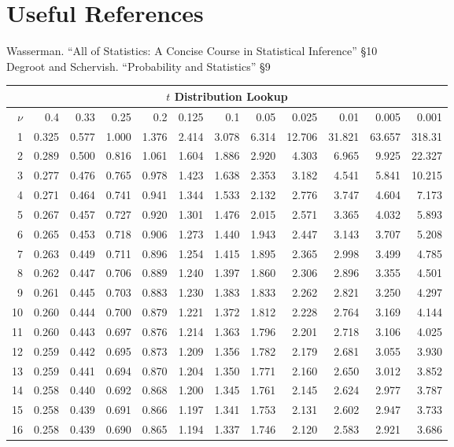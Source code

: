 \section*{Useful References}
Wasserman. ``All of Statistics: A Concise Course in Statistical Inference'' \S10\\
Degroot and Schervish. ``Probability and Statistics''  \S9
\clearpage 
\begin{center}
\begin{tabular}
      {|r||rrr|rrr|rrr|rr|}
\multicolumn{12}{c}{$t$ Distribution Lookup} \\
\hline
$\nu$&0.4&0.33&0.25&0.2&0.125&0.1&0.05&0.025&0.01&0.005
     &0.001\\
    \hline\hline
 1&0.325&0.577&1.000&1.376&2.414&3.078&6.314&12.706&31.821&63.657&318.31 \\
 2&0.289&0.500&0.816&1.061&1.604&1.886&2.920&4.303&6.965&9.925&22.327 \\
 3&0.277&0.476&0.765&0.978&1.423&1.638&2.353&3.182&4.541&5.841&10.215 \\
 4&0.271&0.464&0.741&0.941&1.344&1.533&2.132&2.776&3.747&4.604&7.173 \\
 5&0.267&0.457&0.727&0.920&1.301&1.476&2.015&2.571&3.365&4.032&5.893 \\
 \hline
 6&0.265&0.453&0.718&0.906&1.273&1.440&1.943&2.447&3.143&3.707&5.208 \\
 7&0.263&0.449&0.711&0.896&1.254&1.415&1.895&2.365&2.998&3.499&4.785 \\
 8&0.262&0.447&0.706&0.889&1.240&1.397&1.860&2.306&2.896&3.355&4.501 \\
 9&0.261&0.445&0.703&0.883&1.230&1.383&1.833&2.262&2.821&3.250&4.297 \\
10&0.260&0.444&0.700&0.879&1.221&1.372&1.812&2.228&2.764&3.169&4.144 \\
\hline
11&0.260&0.443&0.697&0.876&1.214&1.363&1.796&2.201&2.718&3.106&4.025 \\
12&0.259&0.442&0.695&0.873&1.209&1.356&1.782&2.179&2.681&3.055&3.930 \\
13&0.259&0.441&0.694&0.870&1.204&1.350&1.771&2.160&2.650&3.012&3.852 \\
14&0.258&0.440&0.692&0.868&1.200&1.345&1.761&2.145&2.624&2.977&3.787 \\
15&0.258&0.439&0.691&0.866&1.197&1.341&1.753&2.131&2.602&2.947&3.733 \\
\hline
16&0.258&0.439&0.690&0.865&1.194&1.337&1.746&2.120&2.583&2.921&3.686 \\

\end{tabular}
\end{center}

